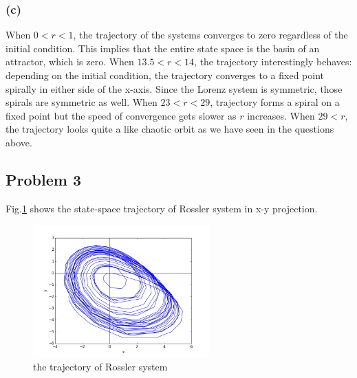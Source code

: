 \documentclass{article}
\begin{document}
\subsubsection*{(c)}
When $0 < r < 1$, the trajectory of the systems converges to zero regardless of the initial condition. This implies that the entire state space is the basin of an attractor, which is zero. When $13.5 < r < 14$, the trajectory interestingly behaves: depending on the initial condition, the trajectory converges to a fixed point spirally in either side of the x-axis. Since the Lorenz system is symmetric, those spirals are symmetric as well. When $23 < r < 29$, trajectory forms a spiral on a fixed point but the speed of convergence gets slower as $r$ increases. When $29 < r$, the trajectory looks quite a like chaotic orbit as we have seen in the questions above. 

\subsection*{Problem 3}
Fig.\ref{q3} shows the state-space trajectory of Rossler system in x-y projection. 
\begin{figure}[h] 
  \centering
  \includegraphics[height=2in]{figs/q3/fig.png}
  \caption{the trajectory of Rossler system}
  \label{q3}
\end{figure}
\end{document}
